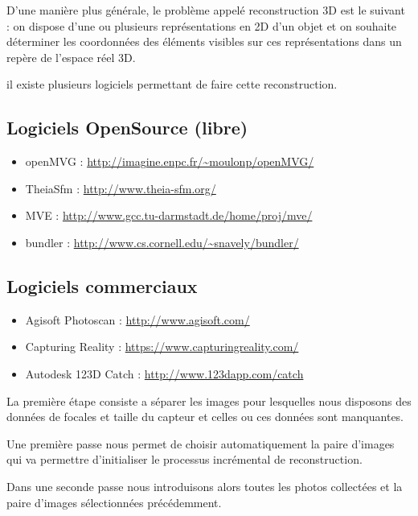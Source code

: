 \documentclass[a4paper,10pt,french]{sphinxhowto}
\begin{document}
D'une manière plus générale, le problème appelé reconstruction 3D est le suivant : on dispose d'une ou plusieurs représentations en 2D d'un objet et on souhaite déterminer les coordonnées des éléments visibles sur ces représentations dans un repère de l'espace réel 3D.

il existe plusieurs logiciels permettant de faire cette reconstruction.


\subsection{\textbf{Logiciels OpenSource (libre)}}
\label{Sfm:logiciels-opensource-libre}\begin{itemize}
\item {} 
openMVG :  \href{http://imagine.enpc.fr/~moulonp/openMVG/}{http://imagine.enpc.fr/\textasciitilde{}moulonp/openMVG/}

\item {} 
TheiaSfm : \href{http://www.theia-sfm.org/}{http://www.theia-sfm.org/}

\item {} 
MVE : \href{http://www.gcc.tu-darmstadt.de/home/proj/mve/}{http://www.gcc.tu-darmstadt.de/home/proj/mve/}

\item {} 
bundler : \href{http://www.cs.cornell.edu/~snavely/bundler/}{http://www.cs.cornell.edu/\textasciitilde{}snavely/bundler/}

\end{itemize}


\subsection{\textbf{Logiciels commerciaux}}
\label{Sfm:logiciels-commerciaux}\begin{itemize}
\item {} 
Agisoft Photoscan : \href{http://www.agisoft.com/}{http://www.agisoft.com/}

\item {} 
Capturing Reality : \href{https://www.capturingreality.com/}{https://www.capturingreality.com/}

\item {} 
Autodesk 123D Catch : \href{http://www.123dapp.com/catch}{http://www.123dapp.com/catch}

\end{itemize}

\begin{DUlineblock}{0em}
\item[] La première étape consiste a séparer les images pour lesquelles nous disposons des données de focales et taille du capteur et celles ou ces données sont manquantes.
\item[] Une première passe nous permet de choisir automatiquement la paire d'images qui va permettre d'initialiser le processus incrémental de reconstruction.
\item[] Dans une seconde passe nous introduisons alors toutes les photos collectées et la paire d'images sélectionnées précédemment.
\end{DUlineblock}
\end{document}
